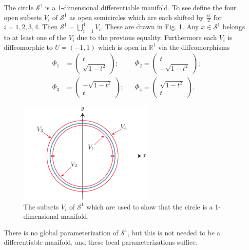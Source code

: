\begin{ex}
	The circle $\mathcal{S}^{1}$ is a 1-dimensional differentiable manifold. To see define the four open subsets $V_i$ of $\mathcal{S}^{1}$ as open semicircles which are each shifted by $\frac{i \pi }{2} $ for $i=1,2,3,4$. Then $\mathcal{S}^{1} = \bigcup_{i=1}^{4}V_i$. These are drawn in Fig. \ref{fig:s1_subsets}. Any $x\in \mathcal{S}^{1}$ belongs to at least one of the $V_i$ due to the previous equality. Furthermore each $V_i$ is diffeomorphic to $U=(-1,1)$ which is open in $\mathbb{R}^{1}$ via the diffeomorphisms
	\begin{subequations}
		\begin{align}
		\Phi_1 &= 
		\begin{pmatrix}
			t\\ \sqrt{1-t^2}
		\end{pmatrix}
		;&&\Phi_2 = 
		\begin{pmatrix}
			t\\ -\sqrt{1-t^2}
		\end{pmatrix}
		; \\
		\Phi_3 &= 
		\begin{pmatrix}
			-\sqrt{1-t^2}\\ t
		\end{pmatrix}
		;&&\Phi_4 = 
		\begin{pmatrix}
			\sqrt{1-t^2}\\ t
		\end{pmatrix}
		.
		\end{align}
	\end{subequations}
\begin{figure}[h!]
	\centering
	\includegraphics[width=0.6\textwidth]{figures/ch9/3s1_subsets.pdf}
	\caption{The subsets $V_i$ of $\mathcal{S}^{1} $ which are used to show that the circle is a 1-dimensional manifold.}
	\label{fig:s1_subsets}
\end{figure}

There is no global parameterization of $\mathcal{S}^{1}$, but this is not needed to be a differentiable manifold, and these local parameterizations suffice.	
\end{ex}

